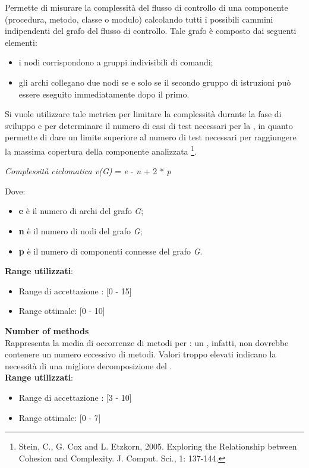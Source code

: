 Permette di misurare la complessità del flusso di controllo di una componente (procedura, metodo, classe o modulo) calcolando tutti i possibili cammini indipendenti del grafo del flusso di controllo. Tale grafo è composto dai seguenti elementi:
\begin{itemize}
	\item i nodi corrispondono a gruppi indivisibili di comandi;
	\item gli archi collegano due nodi se e solo se il secondo gruppo di istruzioni può essere eseguito immediatamente dopo il primo.
\end{itemize}
Si vuole utilizzare tale metrica per limitare la complessità durante la fase di sviluppo e per determinare il numero di casi di test necessari per la , in quanto permette di dare un limite superiore al numero di test necessari per raggiungere la massima copertura della componente analizzata \footnote{Stein, C., G. Cox and L. Etzkorn, 2005. Exploring the Relationship between Cohesion and Complexity. J. Comput. Sci., 1: 137-144.}.
\begin{center}
	\textit{Complessità ciclomatica v(G)} = \textit{e} - \textit{n} + 2 * \textit{p}
\end{center}
Dove:
\begin{itemize}
	\item \textbf{e} è il numero di archi del grafo \textit{G};
	\item \textbf{n} è il numero di nodi del grafo \textit{G};
	\item \textbf{p} è il numero di componenti connesse del grafo \textit{G}.
\end{itemize}
\textbf{Range utilizzati}:
\begin{itemize}
	\item Range di accettazione : [0 - 15]
	\item Range ottimale: [0 - 10]
\end{itemize}

\textbf{Number of methods}\\

Rappresenta la media di occorrenze di metodi per : un , infatti, non dovrebbe contenere un numero eccessivo di metodi. Valori troppo elevati indicano la necessità di una migliore decomposizione del . \\

\textbf{Range utilizzati}:

\begin{itemize}
	\item Range di accettazione : [3 - 10]
	\item Range ottimale: [0 - 7]
\end{itemize}


